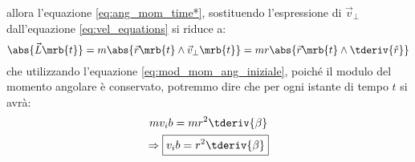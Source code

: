 \begin{itemize}
\begin{equation}
    \end{equation}
    allora l'equazione \ref{eq:ang_mom_time*}, sostituendo l'espressione di
    $\vec{v}_\perp$ dall'equazione
    \ref{eq:vel_equations} si riduce a:
    \begin{equation}
      \abs{\vec{L}\mrb{t}} = m
      \abs{\vec{r}\mrb{t}\wedge\vec{v}_\perp\mrb{t}} =
      mr\abs{\vec{r}\mrb{t}\wedge\tderiv{\hat{r}}}
    \end{equation}
    che utilizzando l'equazione \ref{eq:mod_mom_ang_iniziale}, poiché il modulo
    del momento angolare è conservato, potremmo dire che per ogni istante di
    tempo $t$ si avrà:
    \begin{equation}
      \begin{gathered}
        mv_ib = mr^2\tderiv{\beta}\\
        \Rightarrow\boxed{v_ib = r^2\tderiv{\beta}}
      \end{gathered}
      \label{eq:deriv_beta}
    \end{equation}


\end{itemize}
